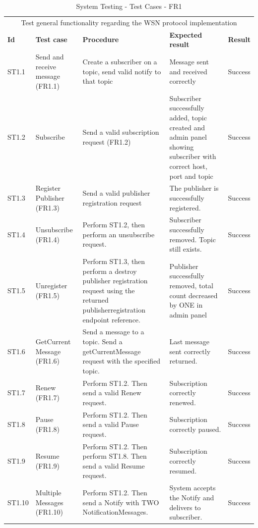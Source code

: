 \begin{table}[ht!]
\begin{tabular}{|m{1cm}|m{2cm}|m{4cm}|m{3cm}|m{1cm}|}
\hline
\rowcolor{lightgray}
\multicolumn{5}{|c|}{\textbf{FR1.1-1.10, WSN}} \\ \hline
\multicolumn{5}{|c|}{{Test general functionality regarding the WSN protocol implementation}} \\ \hline
\textbf{Id} & \textbf{Test case} & \textbf{Procedure} & \textbf{Expected result} & \textbf{Result} \\ \hline
ST1.1 & Send and receive message (FR1.1) & Create a subscriber on a topic, send valid notify to that topic & Message sent and received correctly & Success \\ \hline
ST1.2 & Subscribe & Send a valid subscription request (FR1.2) & Subscriber successfully added, topic created and admin panel showing subscriber with correct host, port and topic & Success \\ \hline
ST1.3 & Register Publisher (FR1.3) & Send a valid publisher registration request & The publisher is successfully registered. & Success \\ \hline
ST1.4 & Unsubscribe (FR1.4) & Perform ST1.2, then perform an unsubscribe request. & Subscriber successfully removed. Topic still exists. & Success \\ \hline
ST1.5 & Unregister (FR1.5) & Perform ST1.3, then perform a destroy publisher registration request using the returned publisherregistration endpoint reference. & Publisher successfully removed, total count decreased by ONE in admin panel & Success \\ \hline
ST1.6 & GetCurrent Message (FR1.6) & Send a message to a topic. Send a getCurrentMessage request with the specified topic. & Last message sent correctly returned. & Success \\ \hline
ST1.7 & Renew (FR1.7) & Perform ST1.2. Then send a valid Renew request. & Subscription correctly renewed. & Success \\ \hline
ST1.8 & Pause (FR1.8) & Perform ST1.2. Then send a valid Pause request. & Subscription correctly paused. & Success \\ \hline
ST1.9 & Resume (FR1.9) & Perform ST1.2. Then perform ST1.8. Then send a valid Resume request. & Subscription correctly resumed. & Success \\ \hline
ST1.10 & Multiple Messages (FR1.10) & Perform ST1.2. Then send a Notify with TWO NotificationMessages. & System accepts the Notify and delivers to subscriber. & Success \\ \hline
\end{tabular}
\caption{System Testing - Test Cases - FR1}
\label{table:system-testing-cases-fr1}
\end{table}

